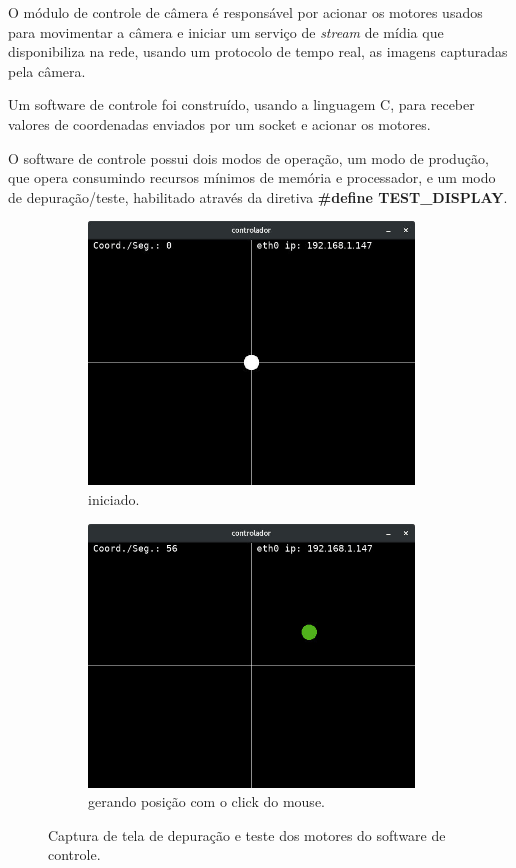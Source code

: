 O módulo de controle de câmera é responsável por acionar os motores usados para movimentar a câmera e iniciar um serviço de \textit{stream} de mídia que disponibiliza na rede, usando um protocolo de tempo real, as imagens capturadas pela câmera.\par
Um software de controle foi construído, usando a linguagem C, para receber valores de coordenadas enviados por um socket e acionar os motores.\par
O software de controle possui dois modos de operação, um modo de produção, que opera consumindo recursos mínimos de memória e processador, e um modo de depuração/teste, habilitado através da diretiva \textbf{\#define TEST\_DISPLAY}.
\begin{figure}[H]
	\centering
	\begin{subfigure}{.5\textwidth}
		\includegraphics[width=0.95\textwidth]{figuras/controlador.jpg}
		\caption{iniciado.}
		\label{fig:controlador_teste}
	\end{subfigure}%
	\begin{subfigure}{.5\textwidth}
		\includegraphics[width=0.95\textwidth]{figuras/controlador2.jpg}
		\caption{gerando posição com o click do mouse.}
		\label{fig:controlador_teste_coordenada}
	\end{subfigure}
	\caption{Captura de tela de depuração e teste dos motores do software de controle.}
\end{figure}

